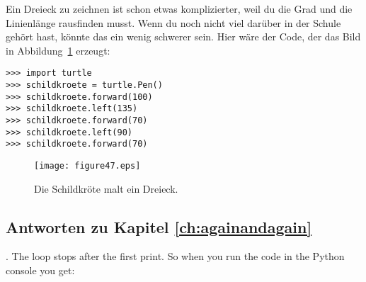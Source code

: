 \noindent
Ein Dreieck zu zeichnen ist schon etwas komplizierter, weil du die Grad und die Linienlänge rausfinden musst. Wenn du noch nicht viel darüber in der Schule gehört hast, könnte das ein wenig schwerer sein. Hier wäre der Code, der das Bild in Abbildung~\ref{fig47} erzeugt:

\begin{listing}
\begin{verbatim}
>>> import turtle
>>> schildkroete = turtle.Pen()
>>> schildkroete.forward(100)
>>> schildkroete.left(135)
>>> schildkroete.forward(70)
>>> schildkroete.left(90)
>>> schildkroete.forward(70)
\end{verbatim}
\end{listing}

\begin{figure}
\begin{center}
\texttt{[image: figure47.eps]}
\end{center}
\caption{Die Schildkröte malt ein Dreieck.}\label{fig47}
\end{figure}

\subsection*{Antworten zu Kapitel \ref{ch:againandagain}}

. The loop stops after the first print.  So when you run the code in the Python console you get:


